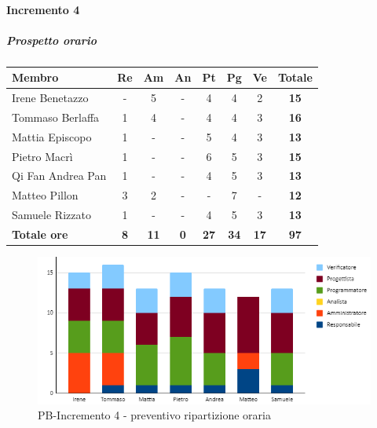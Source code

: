 \paragraph{Incremento 4}
\subparagraph{Prospetto orario}
\begin{center}
	\renewcommand{\arraystretch}{1.8} %
	\begin{tabular}{ |m{10em}|c|c|c|c|c|c|c| }
	\hline
	\textbf{Membro} & \textbf{Re} & \textbf{Am} &  \textbf{An} &  \textbf{Pt} &  \textbf{Pg} &  \textbf{Ve} &  \textbf{Totale}\\
    \hline
    Irene Benetazzo   & - & 5 & - & 4 & 4 & 2 & \textbf{15} \\
    \hline
    Tommaso Berlaffa  & 1 & 4 & - & 4 & 4 & 3 & \textbf{16} \\
    \hline
    Mattia Episcopo   & 1 & - & - & 5 & 4 & 3 & \textbf{13} \\
    \hline
    Pietro Macrì      & 1 & - & - & 6 & 5 & 3 & \textbf{15} \\
    \hline
    Qi Fan Andrea Pan & 1 & - & - & 4 & 5 & 3 & \textbf{13} \\
    \hline
    Matteo Pillon     & 3 & 2 & - & - & 7 & - & \textbf{12} \\
    \hline
    Samuele Rizzato   & 1 & - & - & 4 & 5 & 3 & \textbf{13} \\
    \hline
    \textbf{Totale ore} & \textbf{8} & \textbf{11} &  \textbf{0} &  \textbf{27} &  \textbf{34} &  \textbf{17} &  \textbf{97}\\
    \hline
	\end{tabular}
\end{center}
\begin{figure}[H]
   \centering\includegraphics{images/preventivo/PB-incremento4-ore.png}
   \caption{PB-Incremento 4 - preventivo ripartizione oraria}
\end{figure}


